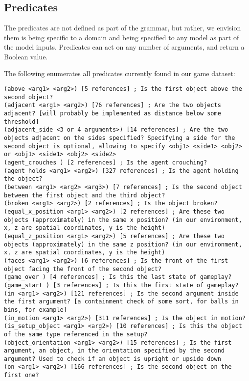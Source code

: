 \documentclass{article}
\begin{document}
\subsection{Predicates} \label{sec:predicates}
The predicates are not defined as part of the grammar, but rather, we envision them is being specific to a domain and being specified to any model as part of the model inputs. 
Predicates can act on any number of arguments, and return a Boolean value.
            
The following enumerates all predicates currently found in our game dataset:

\begin{lstlisting}
(above <arg1> <arg2>) [5 references] ; Is the first object above the second object?
(adjacent <arg1> <arg2>) [76 references] ; Are the two objects adjacent? [will probably be implemented as distance below some threshold]
(adjacent_side <3 or 4 arguments>) [14 references] ; Are the two objects adjacent on the sides specified? Specifying a side for the second object is optional, allowing to specify <obj1> <side1> <obj2> or <obj1> <side1> <obj2> <side2>
(agent_crouches ) [2 references] ; Is the agent crouching?
(agent_holds <arg1> <arg2>) [327 references] ; Is the agent holding the object?
(between <arg1> <arg2> <arg3>) [7 references] ; Is the second object between the first object and the third object?
(broken <arg1> <arg2>) [2 references] ; Is the object broken?
(equal_x_position <arg1> <arg2>) [2 references] ; Are these two objects (approximately) in the same x position? (in our environment, x, z are spatial coordinates, y is the height)
(equal_z_position <arg1> <arg2>) [5 references] ; Are these two objects (approximately) in the same z position? (in our environment, x, z are spatial coordinates, y is the height)
(faces <arg1> <arg2>) [6 references] ; Is the front of the first object facing the front of the second object?
(game_over ) [4 references] ; Is this the last state of gameplay?
(game_start ) [3 references] ; Is this the first state of gameplay?
(in <arg1> <arg2>) [121 references] ; Is the second argument inside the first argument? [a containment check of some sort, for balls in bins, for example]
(in_motion <arg1> <arg2>) [311 references] ; Is the object in motion?
(is_setup_object <arg1> <arg2>) [10 references] ; Is this the object of the same type referenced in the setup?
(object_orientation <arg1> <arg2>) [15 references] ; Is the first argument, an object, in the orientation specified by the second argument? Used to check if an object is upright or upside down
(on <arg1> <arg2>) [166 references] ; Is the second object on the first one?

\end{lstlisting}
\end{document}

